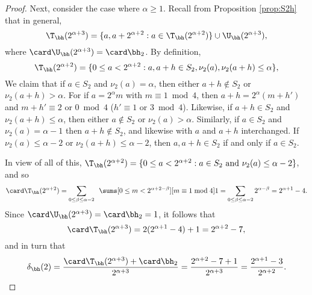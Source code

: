 \documentclass[12pt, reqno, twoside, letterpaper]{amsart}
\begin{document}
\begin{nix}
\begin{proof}
Next, consider the case where $\alpha \ge 1$.
%
Recall from Proposition \ref{prop:S2h} that in general, 
\[
 \T_{\bh}(2^{\alpha + 3}) 
  =
   \{a,a + 2^{\alpha + 2} : a \in \T_{\bh}(2^{\alpha + 2})\}
    \cup 
     \U_{\bh}(2^{\alpha + 3}),
\]
where $\card \U_{\bh}(2^{\alpha + 3}) = \card \bh_2$.
%
By definition,  
\[
 \T_{\bh}(2^{\alpha + 2}) 
  =
   \{0 \le a < 2^{\alpha + 2} : a,a + h \in S_2, \nu_2(a),\nu_2(a + h) \le \alpha\},
\]
%
We claim that if $a \in S_2$ and $\nu_2(a) = \alpha$, then either 
$a + h \not\in S_2$ or $\nu_2(a + h) > \alpha$.
%
For if $a = 2^{\alpha}m$ with $m \equiv 1 \bmod 4$, then   
$a + h = 2^{\alpha}(m + h')$ and $m + h' \equiv 2$ or 
$0 \bmod 4$ ($h' \equiv 1$ or $3 \bmod 4$).
%
Likewise, if $a + h \in S_2$ and $\nu_2(a + h) \le \alpha$, then 
either $a \not\in S_2$ or $\nu_2(a) > \alpha$.
%
Similarly, if $a \in S_2$ and $\nu_2(a) = \alpha - 1$ then 
$a + h \not\in S_2$, and likewise with $a$ and $a + h$ 
interchanged.
%
If $\nu_2(a) \le \alpha - 2$ or $\nu_2(a + h) \le \alpha - 2$, 
then $a,a + h \in S_2$ if and only if $a \in S_2$.

In view of all of this, 
$
 \T_{\bh}(2^{\alpha + 2})
  =
   \{0 \le a < 2^{\alpha + 2} : a \in S_2 \,\, \hbox{and} \,\, \nu_2(a) \le \alpha - 2\} 
$, 
and so 
\[
 \card \T_{\bh}(2^{\alpha + 2})
  =
   \sum_{0 \le \beta \le \alpha - 2}
    \hspace{5pt}
     \sums[0 \le m < 2^{\alpha + 2 - \beta} ][m \equiv 1 \bmod 4] 1
      =
       \sum_{0 \le \beta \le \alpha - 2}
         2^{\alpha - \beta}
        =
         2^{\alpha + 1} - 4.
\]
%
Since $\card \U_{\bh}(2^{\alpha + 3}) = \card \bh_2 = 1$, it 
follows that 
\[
 \card \T_{\bh}(2^{\alpha + 3}) 
  = 2(2^{\alpha + 1} - 4) + 1 = 2^{\alpha + 2} - 7, 
\]
and in turn that 
\[
 \delta_{\bh}(2)
  = 
   \frac{\card \T_{\bh}(2^{\alpha + 3}) + \card \bh_2}{2^{\alpha + 3}}
    =
     \frac{2^{\alpha + 2} - 7 + 1}{2^{\alpha + 3}}
      =
       \frac{2^{\alpha + 1} - 3}{2^{\alpha + 2}}.
\]


\end{proof}
\end{nix}
\end{document}
